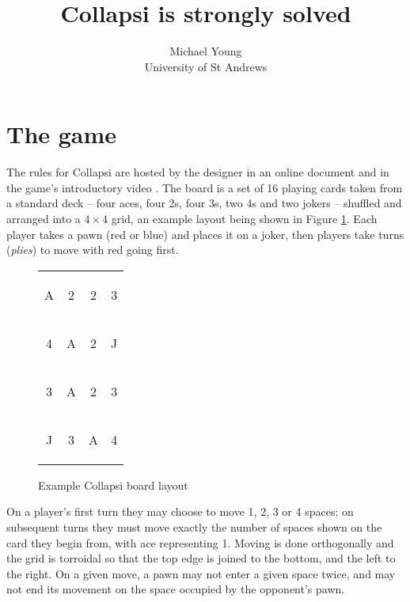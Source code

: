 \documentclass[a4paper, twocolumn]{article}
\title{Collapsi is strongly solved}
\author{Michael Young\\University of St Andrews}
\newcommand\card[1]{\begin{tcolorbox}#1\end{tcolorbox}}
\newcommand\board[8]{
  \setlength{\tabcolsep}{0.1cm}
  \begin{tabular}{c c c c}
    \card{#1} & \card{#2} & \card{#3} & \card{#4} \\
    \card{#5} & \card{#6} & \card{#7} & \card{#8} \\
    \boardmore
}
\newcommand\boardmore[8]{
    \card{#1} & \card{#2} & \card{#3} & \card{#4} \\
    \card{#5} & \card{#6} & \card{#7} & \card{#8}
  \end{tabular}
}
\begin{document}
\maketitle



\section{The game}

The rules for Collapsi are hosted by the designer in an online document
\cite{rules} and in the game's introductory video \cite{youtube}. The
board is a set of 16 playing cards taken from a standard deck -- four aces, four
2s, four 3s, two 4s and two jokers -- shuffled and arranged into a $4\times 4$
grid, an example layout being shown in Figure \ref{fig:board}. Each player takes
a pawn (red or blue) and places it on a joker, then players take turns
(\textit{plies}) to move with red going first.

\begin{figure}[ht]
  \centering
  \board A223 4A2J 3A23 J3A4
  \caption{Example Collapsi board layout}
  \label{fig:board}
\end{figure}

On a player's first turn they may choose to move 1, 2, 3 or 4 spaces; on
subsequent turns they must move exactly the number of spaces shown on the card
they begin from, with ace representing 1. Moving is done orthogonally and the
grid is torroidal so that the top edge is joined to the bottom, and the left to
the right. On a given move, a pawn may not enter a given space twice, and may
not end its movement on the space occupied by the opponent's pawn.
\end{document}
